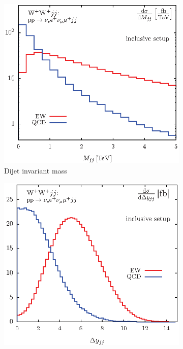 \begin{figure}[htbp]
  \centering
  \begin{subfigure}[b]{.48\textwidth}
    \includegraphics[width=\textwidth]{figs/ssww_13tev/introduction/vbs_mjj}
    \caption{Dijet invariant mass}
    \label{fig:ssww13tev_dijet_comparison_mjj}
  \end{subfigure}
  \begin{subfigure}[b]{.4842\textwidth}
    \includegraphics[width=\textwidth]{figs/ssww_13tev/introduction/vbs_dyjj}

\end{subfigure}
\end{figure}

